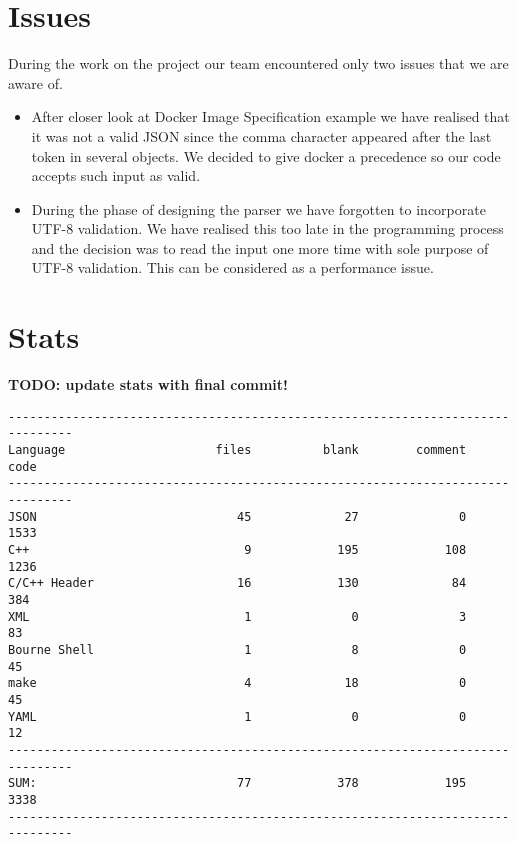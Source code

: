 \documentclass[paper=a4, fontsize=11pt, abstract=on]{scrartcl} %
\numberwithin{equation}{section} %
\numberwithin{figure}{section} %
\numberwithin{table}{section} %
\begin{document}
\section{Issues}

During the work on the project our team encountered only two issues that we are
aware of.

\begin{itemize}

    \item After closer look at Docker Image Specification example we have
        realised that it was not a valid JSON since the comma character
        appeared after the last token in several objects. We decided to give
        docker a precedence so our code accepts such input as valid.

    \item During the phase of designing the parser we have forgotten to
        incorporate UTF-8 validation. We have realised this too late in the
        programming process and the decision was to read the input one more time
        with sole purpose of UTF-8 validation. This can be considered as a
        performance issue.

\end{itemize}

\section{Stats}

\textbf{TODO: update stats with final commit!}

\begin{verbatim}
-------------------------------------------------------------------------------
Language                     files          blank        comment           code
-------------------------------------------------------------------------------
JSON                            45             27              0           1533
C++                              9            195            108           1236
C/C++ Header                    16            130             84            384
XML                              1              0              3             83
Bourne Shell                     1              8              0             45
make                             4             18              0             45
YAML                             1              0              0             12
-------------------------------------------------------------------------------
SUM:                            77            378            195           3338
-------------------------------------------------------------------------------
\end{verbatim}
\end{document}
